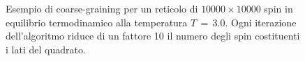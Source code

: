 \begin{figure}[htbp]
    \caption{Esempio di coarse-graining per un reticolo di $10000 \times 10000$ spin in equilibrio termodinamico alla 
    temperatura $T\,=\,3.0$. Ogni iterazione dell'algoritmo riduce di un fattore 10 il numero degli spin costituenti i lati 
    del quadrato.}
    \label{fig: cg_3.0}
\end{figure}

\vspace*{\fill}